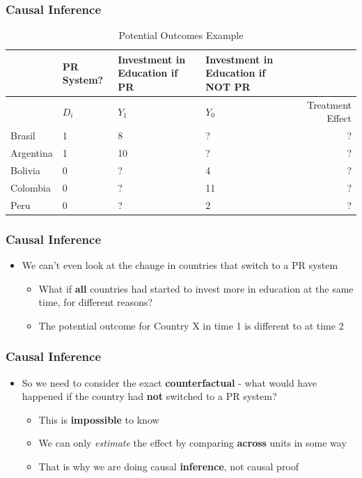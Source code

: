\documentclass[xcolor=x11names,compress]{beamer}\usepackage[]{graphicx}\usepackage[]{color}
\renewcommand{\(}{\begin{columns}}
\renewcommand{\)}{\end{columns}}
\newcommand{\<}[1]{\begin{column}{#1}}
\renewcommand{\>}{\end{column}}
\begin{document}
\begin{frame}
\frametitle{Causal Inference}
\footnotesize
\begin{table}[htbp]
  \centering
  \caption{Potential Outcomes Example}
    \begin{tabular}{|p{1.8cm}|p{2.2cm}|p{2.2cm}|p{1.8cm}|r|}
    \hline
          & \multicolumn{1}{p{1.8cm}|}{PR System?} & \multicolumn{1}{p{2.2cm}|}{Investment in Education if PR} & \multicolumn{1}{p{2.2cm}|}{Investment in Education if NOT PR} &  \bigstrut\\
    \hline
          & \multicolumn{1}{p{1.8cm}|}{$D_i$} & \multicolumn{1}{p{2.2cm}|}{$Y_1$} & \multicolumn{1}{p{2.2cm}|}{$Y_0$} & \multicolumn{1}{p{1.8cm}|}{Treatment Effect} \bigstrut\\
    \hline
    Brasil & 1 & 8     & ?      & ? \bigstrut\\
    \hline
    Argentina & 1 & 10    & ?      & ? \bigstrut\\
    \hline
    Bolivia & 0 & ?     & 4     & ? \bigstrut\\
    \hline
    Colombia & 0 &  ?   & 11    & ? \bigstrut\\
    \hline
    Peru & 0 & ?     & 2     & ? \bigstrut\\
    \hline
    \end{tabular}%
  \label{tab:addlabel}%
\end{table}%
\normalsize
\end{frame}

\begin{frame}
\frametitle{Causal Inference}
\begin{itemize}
\item We can't even look at the change in countries that switch to a PR system
\pause
\begin{itemize}
\item What if \textbf{all} countries had started to invest more in education at the same time, for different reasons?
\pause
\item The potential outcome for Country X in time 1 is different to at time 2
\end{itemize}
\end{itemize}
\end{frame}

\begin{frame}
\frametitle{Causal Inference}
\begin{itemize}
\item So we need to consider the exact \textbf{counterfactual} - what would have happened if the country had \textbf{not} switched to a PR system?
\pause
\begin{itemize}
\item This is \textbf{impossible} to know
\pause
\item We can only \textit{estimate} the effect by comparing \textbf{across} units in some way
\pause
\item That is why we are doing causal \textbf{inference}, not causal proof
\end{itemize}
\end{itemize}
\end{frame}
\end{document}

